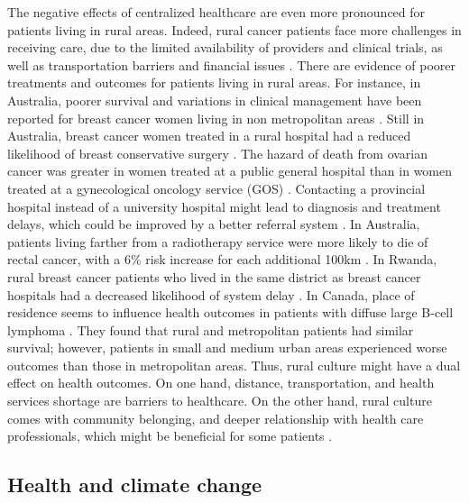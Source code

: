 The negative effects of centralized healthcare are even more pronounced for
patients living in rural areas. Indeed, rural cancer patients face more
challenges in receiving care, due to the limited availability of providers and
clinical trials, as well as transportation barriers and financial issues
\cite{charlton_challenges_2015}. There are evidence of poorer treatments and
outcomes for patients living in rural areas. For instance, in Australia, poorer
survival and variations in clinical management have been reported for breast
cancer women living in non metropolitan areas \cite{dasgupta_variations_2018}.
Still in Australia, breast cancer women treated in a rural hospital had a
reduced likelihood of breast conservative surgery \cite{hall_unequal_2004}.  The
hazard of death from ovarian cancer was greater in women treated at a public
general hospital than in women treated at a gynecological oncology service (GOS)
\cite{tracey_effects_2014}. Contacting a provincial hospital instead of a
university hospital might lead to diagnosis and treatment delays, which could be
improved by a better referral system \cite{thongsuksai_delay_2000}. In
Australia, patients living farther from a radiotherapy service were more likely
to die of rectal cancer, with a 6\% risk increase for each additional 100km
\cite{baade_distance_2011}. In Rwanda, rural breast cancer patients who lived in
the same district as breast cancer hospitals had a decreased likelihood of
system delay \cite{pace_delays_2015}. In Canada, place of residence seems to
influence health outcomes in patients with diffuse large B-cell lymphoma
\cite{lee_effect_2014}. They found that rural and metropolitan patients had
similar survival; however, patients in small and medium urban areas experienced
worse outcomes than those in metropolitan areas. Thus, rural culture might have
a dual effect on health outcomes. On one hand, distance, transportation, and
health services shortage are barriers to healthcare. On the other hand, rural
culture comes with community belonging, and deeper relationship with health care
professionals, which might be beneficial for some patients
\cite{brundisini_chronic_2013}.

\subsection{Health and climate change}


